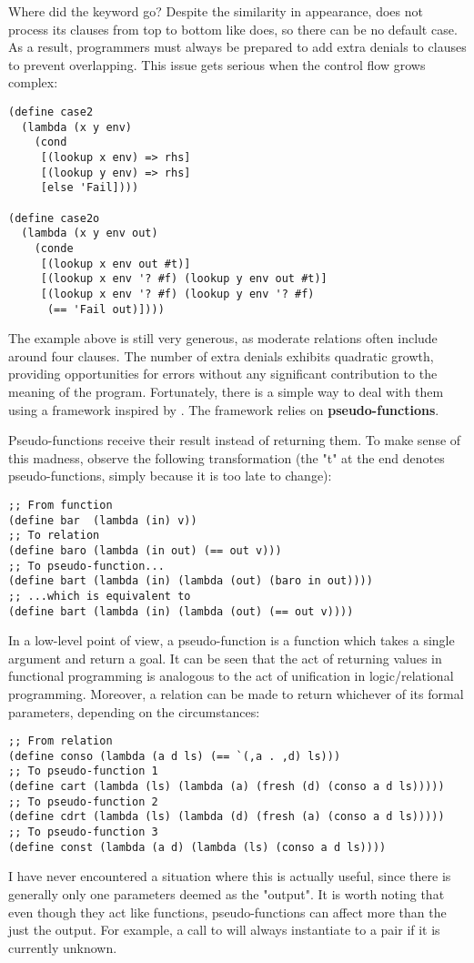 Where did the keyword  go? Despite the similarity in appearance,  does not process its clauses from top to bottom like  does, so there can be no default case. As a result, programmers must always be prepared to add extra denials to  clauses to prevent overlapping. This issue gets serious when the control flow grows complex:

\begin{lstlisting}
(define case2
  (lambda (x y env)
    (cond
     [(lookup x env) => rhs]
     [(lookup y env) => rhs]
     [else 'Fail])))

(define case2o
  (lambda (x y env out)
    (conde
     [(lookup x env out #t)]
     [(lookup x env '? #f) (lookup y env out #t)]
     [(lookup x env '? #f) (lookup y env '? #f)
      (== 'Fail out)])))
\end{lstlisting}

The example above is still very generous, as moderate relations often include around four  clauses. The number of extra denials exhibits quadratic growth, providing opportunities for errors without any significant contribution to the meaning of the program. Fortunately, there is a simple way to deal with them using a framework inspired by \textcite{reif}. The framework relies on \textbf{pseudo-functions}.

Pseudo-functions receive their result instead of returning them. To make sense of this madness, observe the following transformation (the "t" at the end denotes pseudo-functions, simply because it is too late to change):
\begin{lstlisting}
;; From function
(define bar  (lambda (in) v))
;; To relation
(define baro (lambda (in out) (== out v)))
;; To pseudo-function...
(define bart (lambda (in) (lambda (out) (baro in out))))
;; ...which is equivalent to
(define bart (lambda (in) (lambda (out) (== out v))))
\end{lstlisting}

In a low-level point of view, a pseudo-function is a function which takes a single argument and return a goal. It can be seen that the act of returning values in functional programming is analogous to the act of unification in logic/relational programming. Moreover, a relation can be made to return whichever of its formal parameters, depending on the circumstances:
\begin{lstlisting}
;; From relation
(define conso (lambda (a d ls) (== `(,a . ,d) ls)))
;; To pseudo-function 1
(define cart (lambda (ls) (lambda (a) (fresh (d) (conso a d ls)))))
;; To pseudo-function 2
(define cdrt (lambda (ls) (lambda (d) (fresh (a) (conso a d ls)))))
;; To pseudo-function 3
(define const (lambda (a d) (lambda (ls) (conso a d ls))))
\end{lstlisting}
I have never encountered a situation where this is actually useful, since there is generally only one parameters deemed as the "output". It is worth noting that even though they act like functions, pseudo-functions can affect more than the just the output. For example, a call to  will always instantiate  to a pair if it is currently unknown.

